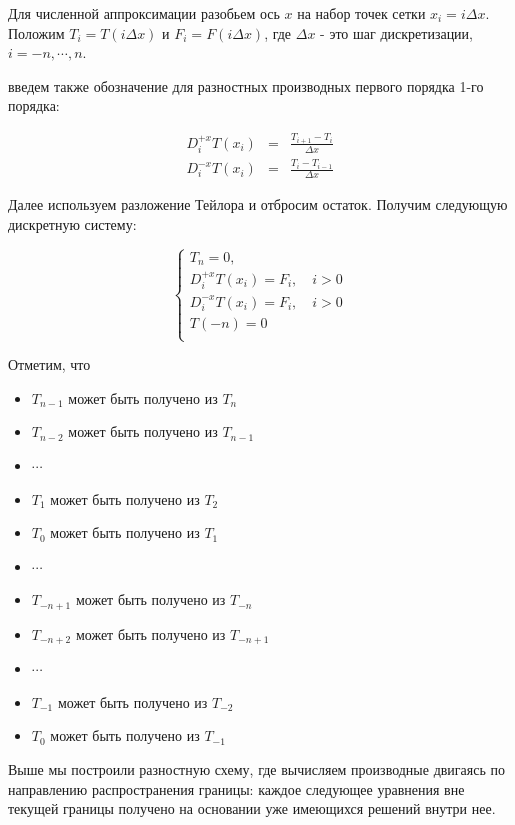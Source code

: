 Для численной аппроксимации разобьем ось $x$ на набор точек сетки
$x_i=i\Delta x$. Положим $T_i = T(i \Delta x)$ и $F_i = F(i \Delta
x)$, где $\Delta x$ - это шаг дискретизации, $i = -n, \cdots,
n$. 

введем также обозначение для разностных производных первого порядка 1-го порядка:

\begin{eqnarray*}
    D^{+x}_iT(x_i) &=& \frac{T_{i+1} - T_{i}}{\Delta x} \\
    D^{-x}_iT(x_i) &=& \frac{T_{i} - T_{i-1}}{\Delta x}
\end{eqnarray*}

Далее используем разложение Тейлора и отбросим остаток. Получим
следующую дискретную систему:


\begin{equation}
  \label{eq:discretise}
  \begin{cases}
      T_n = 0,\\
      D^{+x}_iT(x_i) = F_i, \quad i>0 \\
      D^{-x}_iT(x_i)  = F_i, \quad i>0\\
      T(-n) = 0\\
    \end{cases}
\end{equation}

Отметим, что
\begin{itemize}
\item[ ] $T_{n-1}$ может быть получено из $T_n$
\item[ ] $T_{n-2}$ может быть получено из $T_{n-1}$
\item[ ]  $\cdots$
\item[ ] $T_{1}$ может быть получено из $T_2$
\item[ ] $T_{0}$ может быть получено из $T_{1}$
\item[ ]  $\cdots$
\item[ ] $T_{-n+1}$ может быть получено из $T_{-n}$
\item[ ] $T_{-n+2}$ может быть получено из $T_{-n+1}$
\item[ ]  $\cdots$
\item[ ] $T_{-1}$ может быть получено из $T_{-2}$
\item[ ] $T_{0}$ может быть получено из $T_{-1}$

\end{itemize}

Выше мы построили разностную схему, где вычисляем производные двигаясь
по направлению распространения границы: каждое следующее уравнения вне
текущей границы получено на основании уже имеющихся решений внутри
нее.

